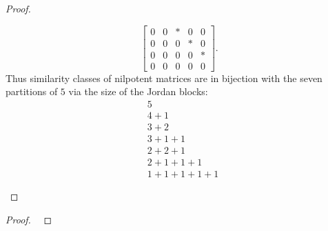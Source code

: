 \documentclass{article}
\begin{document}
\begin{proof}
\begin{enumerate}[(a)]
\[\begin{bmatrix}
        0 & 0 & * & 0 & 0 \\
        0 & 0 & 0 & * & 0 \\
        0 & 0 & 0 & 0 & * \\
        0 & 0 & 0 & 0 & 0
      \end{bmatrix}.
    \] Thus similarity classes of nilpotent matrices are in bijection with the
    seven partitions of $5$ via the size of the Jordan blocks: \begin{align*}
        &5 \\
        &4 + 1 \\
        &3 + 2 \\
        &3 + 1 + 1 \\
        &2 + 2 + 1 \\
        &2 + 1 + 1 + 1\\
        &1 + 1 + 1 + 1 + 1
    \end{align*}
  \end{enumerate}
\end{proof}

\begin{problem}{4} %
\end{problem}

\begin{proof} ~
\end{proof}
\begin{problem}{5} %
\end{problem}
\end{document}
